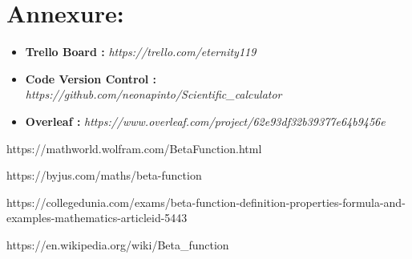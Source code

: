 \documentclass[letterpaper, 11pt]{article}
\begin{document}
\newpage
\section*{Annexure:}
    \begin{itemize}
      \item \textbf{Trello Board :} \textit{https://trello.com/eternity119}
      \item \textbf{Code Version Control :} \textit{https://github.com/neonapinto/Scientific\_calculator}
      \item \textbf{Overleaf :} \textit{https://www.overleaf.com/project/62e93df32b39377e64b9456e}
    \end{itemize}
    
\begin{thebibliography}{}
     
    https://mathworld.wolfram.com/BetaFunction.html
    
    https://byjus.com/maths/beta-function
    
    https://collegedunia.com/exams/beta-function-definition-properties-formula-and-examples-mathematics-articleid-5443
    
    https://en.wikipedia.org/wiki/Beta\_function
\end{thebibliography}
\end{document}
